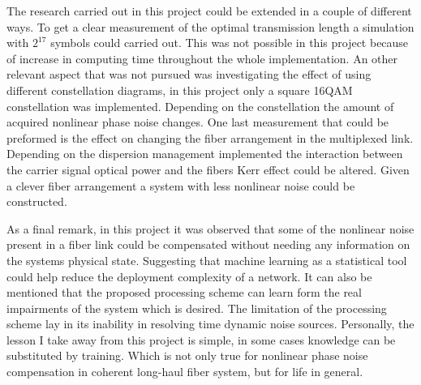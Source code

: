 The research carried out in this project could be extended in a couple of different ways. To get a clear measurement of the optimal transmission length a simulation with $2^{17}$ symbols could carried out. This was not possible in this project because of increase in computing time throughout the whole implementation. An other relevant aspect that was not pursued was investigating the effect of using different constellation diagrams, in this project only a square 16QAM constellation was implemented. Depending on the constellation the amount of acquired nonlinear phase noise changes. One last measurement that could be preformed is the effect on changing the fiber arrangement in the multiplexed link. Depending on the dispersion management implemented the interaction between the carrier signal optical power and the fibers Kerr effect could be altered. Given a clever fiber arrangement a system with less nonlinear noise could be constructed.

As a final remark, in this project it was observed that some of the nonlinear noise present in a fiber link could be compensated without needing any information on the systems physical state. Suggesting that machine learning as a statistical tool could help reduce the deployment complexity of a network. It can also be mentioned that the proposed processing scheme can learn form the real impairments of the system which is desired. The limitation of the processing scheme lay in its inability in resolving time dynamic noise sources. Personally, the lesson I take away from this project is simple, in some cases knowledge can be substituted by training. Which is not only true for nonlinear phase noise compensation in coherent long-haul fiber system, but for life in general.    